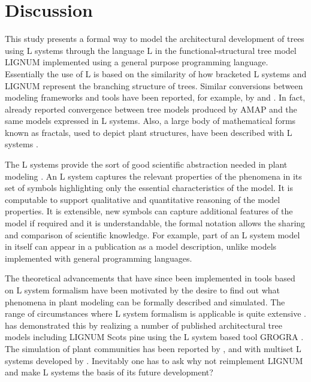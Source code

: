 \section{Discussion}

This  study   presents  a  formal  way  to   model  the  architectural
development of  trees using  L systems through  the language L  in the
functional-structural  tree model LIGNUM  implemented using  a general
purpose programming  language.  Essentially the  use of L is  based on
the similarity  of how  bracketed L systems  and LIGNUM  represent the
branching  structure of trees.   Similar conversions  between modeling
frameworks   and   tools  have   been   reported,   for  example,   by
\citet{ferraro:02}   and   \citet{dzierzon:03}.    In  fact,   already
\citet{kurth:em94} reported  convergence between tree  models produced
by AMAP  and the same  models expressed in  L systems.  Also,  a large
body of  mathematical forms  known as fractals,  used to  depict plant
structures, have been described with L systems \citep{kurth:99}.

The L systems  provide the sort of good  scientific abstraction needed
in plant modeling \citep[c.f.][]{regev:02}.   An L system captures the
relevant  properties   of  the  phenomena   in  its  set   of  symbols
highlighting only  the essential characteristics of the  model.  It is
computable to  support qualitative  and quantitative reasoning  of the
model  properties.    It  is  extensible,  new   symbols  can  capture
additional features of the model if required and it is understandable,
the formal  notation allows the  sharing and comparison  of scientific
knowledge.   For example,  part of  an  L system model  in itself  can
appear  in  a  publication  as  a  model  description,  unlike  models
implemented with general programming languages.

The theoretical advancements that have since been implemented in tools
based on L system formalism have  been motivated by the desire to find
out what  phenomena in  plant modeling can  be formally  described and
simulated.   The range  of circumstances  where L system  formalism is
applicable  is quite  extensive  \citep{pp:99}.  \citet{kurth:99}  has
demonstrated  this by  realizing a  number of  published architectural
tree models including LIGNUM Scots pine \citep{perttunen:96} using the
L system based  tool GROGRA \citep{kurth:94}. The  simulation of plant
communities has been  reported by \citet{deussen:98}, \citet{kurth:99}
and with multiset L  systems developed by \citet{lane:02}.  Inevitably
one has to ask why not reimplement LIGNUM and make L systems the basis
of its future development?

